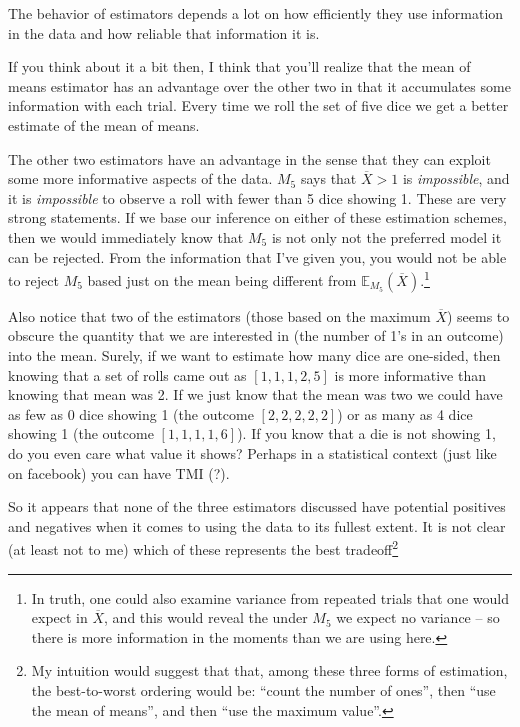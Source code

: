 \documentclass[11pt]{article}
\begin{document}
The behavior of estimators depends a lot on how efficiently they use information in the data and how reliable that information it is.

If you think about it a bit then, I think that you'll realize that the mean of means estimator has an advantage over the other two in that it accumulates some information with each trial.  Every time we roll the set of five dice we get a better estimate of the mean of means.

The other two estimators have an advantage in the sense that they can exploit some more informative aspects of the data. $M_5$ says that  $\overline{X} > 1$ is {\em impossible}, and it is {\em impossible} to observe a roll with fewer than 5 dice showing 1.
These are very strong statements. If we base our inference on either of these estimation schemes, then we would immediately know that $M_5$ is not only not the preferred model it can be rejected.
From the information that I've given you, you would not be able to reject $M_5$ based just on the mean being different from $\mathbb E_{M_5}(\overline{X})$.\footnote{In truth, one could also examine variance from repeated trials that one would expect in $\overline{X}$, and this would reveal the under $M_5$ we expect no variance -- so there is more information in the moments than we are using here.}

Also notice that two of the estimators (those based on the maximum $\overline{X}$) seems to obscure the quantity that we are interested in (the number of 1's in an outcome) into the mean.
Surely, if we want to estimate how many dice are one-sided, then knowing that a set of rolls came out as $[ 1,1,1,2,5]$ is more informative than knowing that mean was 2.
If we just know that the mean was two we could have as few as 0 dice showing 1 (the outcome $[2,2,2,2,2]$) or as many as 4 dice showing 1 (the outcome $[1,1,1,1,6]$).
If you know that a die is not showing 1, do you even care what value it shows? Perhaps in a statistical context (just like on facebook) you can have TMI (?). 

So it appears that none of the three estimators discussed have potential positives and negatives when it comes to using the data to its fullest extent.
It is not clear (at least not to me) which of these represents the best tradeoff\footnote{My intuition would suggest that  that, among these three forms of estimation, the best-to-worst ordering would be: ``count the number of ones'', then ``use the mean of means'', and then ``use the maximum value''.}
\end{document}
